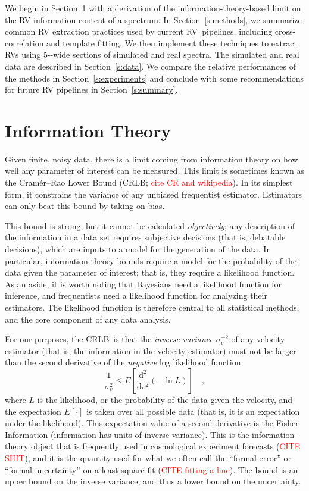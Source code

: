 \documentclass[modern]{aastex62}
\newcommand{\ang}{\text{\normalfont\AA}}
\newcommand{\dd}{\mathrm{d}}
\newcommand{\sectionname}{Section}
\newcommand{\todo}[1]{\textcolor{red}{#1}}  %
\newcommand{\acronym}[1]{{\small{#1}}}
\newcommand{\RV}{\acronym{RV}}
\newcommand{\CRLB}{\acronym{CRLB}}
\begin{document}
We begin in \sectionname~\ref{s:info} with a derivation of the information-theory-based limit on the RV information content of a spectrum. 
In \sectionname~\ref{s:methods}, we summarize common RV extraction practices used by current \RV\ pipelines, including cross-correlation and template fitting. 
We then implement these techniques to extract \RV s using 5-\ang-wide sections of simulated and real spectra.
The simulated and real data are described in \sectionname~\ref{s:data}. 
We compare the relative performances of the methods in \sectionname~\ref{s:experiments} and conclude with some recommendations for future RV pipelines in \sectionname~\ref{s:summary}. 

\section{Information Theory}
\label{s:info}

Given finite, noisy data, there is a limit coming from information
theory on how well any parameter of interest can be measured.
This limit is
sometimes known as the Cram\'er--Rao Lower Bound (\CRLB; \todo{cite CR and wikipedia}).
In its simplest form, it constrains the variance of any unbiased
frequentist estimator.
Estimators can only beat this bound by taking on bias.

This bound is strong, but it cannot be calculated \emph{objectively};
any description of the information in a data set requires
subjective decisions (that is, debatable decisions), which are inputs
to a model for the generation of the data.
In particular, information-theory bounds require a model for the
probability of the data given the parameter of interest; that is, they
require a likelihood function.
As an aside, it is worth noting that
Bayesians need a likelihood function for inference, and
frequentists need a likelihood function for analyzing their estimators.
The likelihood function is therefore central to all statistical methods,
and the core component of any data analysis.

For our purposes, the \CRLB\ is that the \emph{inverse variance} $\sigma_v^{-2}$ of any velocity
estimator (that is, the information in the velocity estimator) must not be larger than the
second derivative of the \emph{negative} log likelihood function:
\begin{equation}
\frac{1}{\sigma_v^2} \leq E\left[\frac{\dd^2}{\dd v^2}(-\ln L)\right] \quad,
\end{equation}
where $L$ is the likelihood, or the probability of the data given the velocity,
and the expectation $E[\cdot]$ is taken over all possible data (that is, it is an
expectation under the likelihood).
This expectation value of a second derivative is the Fisher Information
(information has units of inverse variance).
This is the information-theory object that is frequently used in
cosmological experiment forecasts (\todo{CITE SHIT}),
and it is the quantity used for what we often call the ``formal error'' or
``formal uncertainty'' on a least-square fit (\todo{CITE fitting a line}).
The bound is an upper bound on the inverse variance, and thus a lower bound
on the uncertainty.
\end{document}
